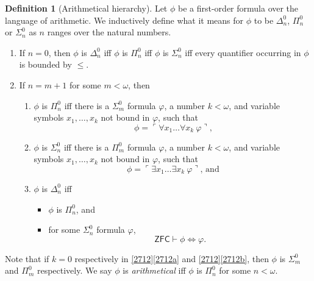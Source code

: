 \documentclass[12pt, twoside]{memoir}
\numberwithin{equation}{section}
\theoremstyle{definition}
\newtheorem{defi}[thm]{Definition}
\theoremstyle{remark}
\theoremstyle{definition}
\theoremstyle{definition}
\theoremstyle{definition}
\theoremstyle{remark}
\begin{document}
\begin{defi}[Arithmetical hierarchy]\label{def247}
Let $\phi$ be a first-order formula over the language of arithmetic. We inductively define what it means for $\phi$ to be $\Delta^0_n$, $\Pi^0_n$ or $\Sigma^0_n$ as $n$ ranges over the natural numbers.
\begin{enumerate}[label=(\arabic*)]
    \item If $n = 0$, then $\phi$ is $\Delta^0_n$ iff $\phi$ is $\Pi^0_n$ iff $\phi$ is $\Sigma^0_n$ iff every quantifier occurring in $\phi$ is bounded by $\leq$.
    \item If $n = m + 1$ for some $m < \omega$, then 
    \begin{enumerate}[label=(\alph*)]
        \item $\phi$ is $\Pi^0_n$ iff there is a $\Sigma^0_m$ formula $\varphi$, a number $k < \omega$, and variable symbols $x_1, \dots, x_k$ not bound in $\varphi$, such that 
        \begin{equation*}
            \phi = \ulcorner \forall x_1 \dots \forall x_k \ \varphi \urcorner \text{,}
        \end{equation*}
        \item $\phi$ is $\Sigma^0_n$ iff there is a $\Pi^0_m$ formula $\varphi$, a number $k < \omega$, and variable symbols $x_1, \dots, x_k$ not bound in $\varphi$, such that 
        \begin{equation*}
            \phi = \ulcorner \exists x_1 \dots \exists x_k \ \varphi \urcorner \text{, and}
        \end{equation*}
        \item $\phi$ is $\Delta^0_n$ iff 
        \begin{itemize}[label=$\circ$]
            \item $\phi$ is $\Pi^0_n$, and
            \item for some $\Sigma^0_n$ formula $\varphi$,
            \begin{equation*}
                \mathsf{ZFC} \vdash \phi \iff \varphi \text{.}
            \end{equation*}
        \end{itemize}
    \end{enumerate}
\end{enumerate}
Note that if $k = 0$ respectively in \ref{2712}\ref{2712a} and \ref{2712}\ref{2712b}, then $\phi$ is $\Sigma^0_m$ and $\Pi^0_m$ respectively. We say $\phi$ is \emph{arithmetical} iff $\phi$ is $\Pi^0_n$ for some $n < \omega$.
\end{defi}
\end{document}

